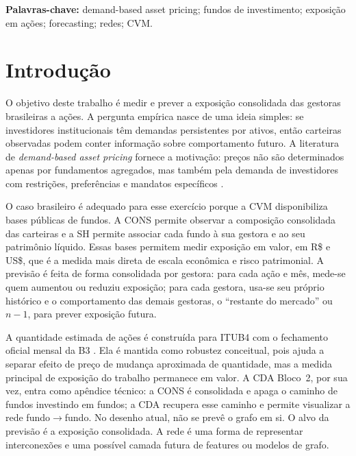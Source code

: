 \documentclass[12pt,a4paper]{report}
\begin{document}
\noindent\textbf{Palavras-chave:} demand-based asset pricing; fundos de investimento; exposição em ações;
forecasting; redes; CVM.

\tableofcontents

\clearpage
{}

\chapter{Introdução}

O objetivo deste trabalho é medir e prever a exposição consolidada das gestoras brasileiras a ações. A
pergunta empírica nasce de uma ideia simples: se investidores institucionais têm demandas persistentes por
ativos, então carteiras observadas podem conter informação sobre comportamento futuro. A literatura de
\emph{demand-based asset pricing} fornece a motivação: preços não são determinados apenas por fundamentos
agregados, mas também pela demanda de investidores com restrições, preferências e mandatos específicos
\citep{koijenyogo2019,gabaixkoijen2021}.

O caso brasileiro é adequado para esse exercício porque a CVM disponibiliza bases públicas de fundos. A CONS
permite observar a composição consolidada das carteiras e a SH permite associar cada fundo à sua gestora e
ao seu patrimônio líquido. Essas bases permitem medir exposição em valor, em R\$ e US\$, que é a medida mais
direta de escala econômica e risco patrimonial. A previsão é feita de forma consolidada por gestora: para
cada ação e mês, mede-se quem aumentou ou reduziu exposição; para cada gestora, usa-se seu próprio histórico
e o comportamento das demais gestoras, o ``restante do mercado'' ou $n-1$, para prever exposição futura.

A quantidade estimada de ações é construída para ITUB4 com o fechamento oficial mensal da B3
\citep{b3_cotahist}. Ela é mantida como robustez conceitual, pois ajuda a separar efeito de preço de mudança
aproximada de quantidade,
mas a medida principal de exposição do trabalho permanece em valor. A CDA Bloco~2, por sua vez, entra como
apêndice técnico: a CONS é consolidada e apaga o caminho de fundos investindo em fundos; a CDA recupera esse
caminho e permite visualizar a rede fundo$\to$fundo. No desenho atual, não se prevê o grafo em si. O alvo da
previsão é a exposição consolidada. A rede é uma forma de representar interconexões e uma possível camada
futura de features ou modelos de grafo.
\end{document}
